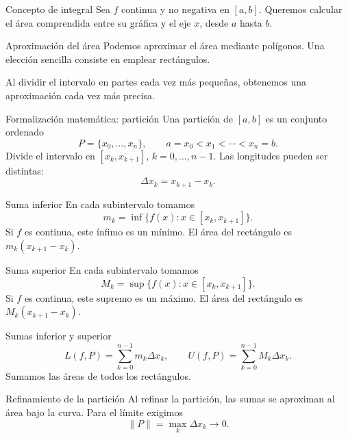 \documentclass[original_version/main.tex]{subfiles}
\begin{document}
\graphicspath{{imagenes/tema4/}{../imagenes/tema4/}}



\begin{frame}{Concepto de integral}
Sea $f$ continua y no negativa en $[a,b]$. Queremos calcular el área comprendida entre su gráfica y el eje $x$, desde $a$ hasta $b$.
\end{frame}

\begin{frame}{Aproximación del área}
Podemos aproximar el área mediante polígonos. Una elección sencilla consiste en emplear rectángulos.\par\medskip Al dividir el intervalo en partes cada vez más pequeñas, obtenemos una aproximación cada vez más precisa.
\end{frame}

\begin{frame}{Formalización matemática: partición}
Una partición de $[a,b]$ es un conjunto ordenado\[P=\{x_0,\ldots,x_n\},\qquad a=x_0<x_1<\cdots<x_n=b.\]Divide el intervalo en $[x_k,x_{k+1}]$, $k=0,\ldots,n-1$. Las longitudes pueden ser distintas:\[\Delta x_k=x_{k+1}-x_k.\]
\end{frame}

\begin{frame}{Suma inferior}
En cada subintervalo tomamos\[m_k=\inf\{f(x):x\in[x_k,x_{k+1}]\}.\]Si $f$ es continua, este ínfimo es un mínimo. El área del rectángulo es $m_k(x_{k+1}-x_k)$.
\end{frame}

\begin{frame}{Suma superior}
En cada subintervalo tomamos\[M_k=\sup\{f(x):x\in[x_k,x_{k+1}]\}.\]Si $f$ es continua, este supremo es un máximo. El área del rectángulo es $M_k(x_{k+1}-x_k)$.
\end{frame}

\begin{frame}{Sumas inferior y superior}
\[L(f,P)=\sum_{k=0}^{n-1}m_k\Delta x_k,\qquad U(f,P)=\sum_{k=0}^{n-1}M_k\Delta x_k.\]Sumamos las áreas de todos los rectángulos.
\end{frame}

\begin{frame}{Refinamiento de la partición}
Al refinar la partición, las sumas se aproximan al área bajo la curva. Para el límite exigimos\[\|P\|=\max_k\Delta x_k\longrightarrow0.\]
\end{frame}
\end{document}
